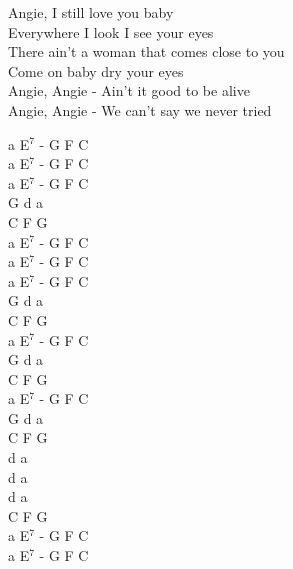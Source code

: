 \documentclass[a5paper, 10pt]{book}
\begin{document}
\begin{minipage}[t]{0.8\textwidth}
  \hspace*{3mm} Angie, I still love you baby\\
  \hspace*{3mm} Everywhere I look I see your eyes\\
  \hspace*{3mm} There ain't a woman that comes close to you\\
  \hspace*{3mm} Come on baby dry your eyes\\

  Angie, Angie - Ain't it good to be alive\\
  Angie, Angie - We can't say we never tried\\

\end{minipage}
\begin{minipage}[t]{0.2\textwidth}
  a E$^7$ - G F C \\
  a E$^7$ - G F C \\
  a E$^7$ - G F C \\

  G d a\\
  C F G\\

  a E$^7$ - G F C \\

  a E$^7$ - G F C \\
  a E$^7$ - G F C \\

  G d a\\
  C F G\\

  a E$^7$ - G F C \\

  G d a\\
  C F G\\

  a E$^7$ - G F C \\

  G d a\\
  C F G\\

  d a\\
  d a\\
  d a\\
  C F G\\

  a E$^7$ - G F C \\
  a E$^7$ - G F C \\

\end{minipage}
\end{document}
